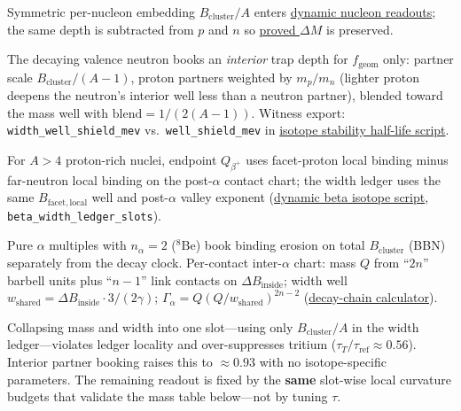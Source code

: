 \documentclass[11pt,notitlepage]{amsart}
\begin{document}
\begin{description}[
  leftmargin=1.5em,
  labelwidth=3.45cm,
  labelsep=0.55em,
  align=right,
  style=nextline,
  font=\bfseries,
  itemsep=0.4em
]
\item[Mass well]
  Symmetric per-nucleon embedding $B_{\mathrm{cluster}}/A$ enters
  \hyperref[lean:dynamic-pn]{dynamic nucleon readouts}; the same depth is subtracted
  from $p$ and $n$ so \hyperref[lean:dynamic-pn]{proved $\Delta M$} is preserved.
\item[Width well]
  The decaying valence neutron books an \emph{interior} trap depth for
  $f_{\mathrm{geom}}$ only: partner scale $B_{\mathrm{cluster}}/(A-1)$, proton
  partners weighted by $m_p/m_n$ (lighter proton deepens the neutron's interior well
  less than a neutron partner), blended toward the mass well with
  $\mathrm{blend}=1/(2(A-1))$.
  Witness export: \texttt{width\_well\_shield\_mev} vs.\ \texttt{well\_shield\_mev} in
  \hyperref[app:scripts]{isotope stability half-life script}.
\item[Post-$\alpha$ $\beta^+$ ledger]
  For $A>4$ proton-rich nuclei, endpoint $Q_{\beta^+}$ uses facet-proton local binding
  minus far-neutron local binding on the post-$\alpha$ contact chart; the width ledger
  uses the same $B_{\mathrm{facet,local}}$ well and post-$\alpha$ valley exponent
  (\hyperref[script:dynamic-beta]{dynamic beta isotope script},
  \texttt{beta\_width\_ledger\_slots}).
\item[Two-$\alpha$ ledger]
  Pure $\alpha$ multiples with $n_\alpha=2$ ($^8\mathrm{Be}$) book binding erosion on total
  $B_{\mathrm{cluster}}$ (BBN) separately from the decay clock.
  Per-contact inter-$\alpha$ chart: mass $Q$ from ``$2n$'' barbell units plus ``$n{-}1$'' link
  contacts on $\Delta B_{\mathrm{inside}}$; width well
  $w_{\mathrm{shared}}=\Delta B_{\mathrm{inside}}\cdot 3/(2\gamma)$;
  $\Gamma_\alpha = Q(Q/w_{\mathrm{shared}})^{2n-2}$
  (\hyperref[script:decay-chain]{decay-chain calculator}).
\end{description}

Collapsing mass and width into one slot---using only $B_{\mathrm{cluster}}/A$ in the
width ledger---violates ledger locality and over-suppresses tritium
($\tau_T/\tau_{\mathrm{ref}}\approx 0.56$). Interior partner booking raises this to
$\approx 0.93$ with no isotope-specific parameters.
The remaining readout is fixed by the \textbf{same} slot-wise local curvature budgets
that validate the mass table below---not by tuning $\tau$.
\end{document}
